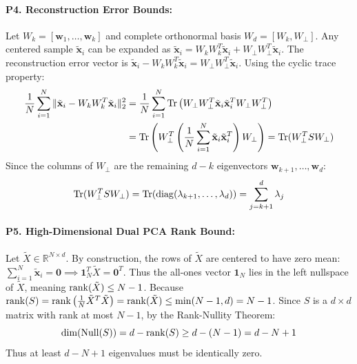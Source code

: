 \paragraph{P4. Reconstruction Error Bounds:}
Let $W_k = [\mathbf{w}_1, \dots, \mathbf{w}_k]$ and complete orthonormal basis $W_d = [W_k, W_\perp]$.
Any centered sample $\tilde{\mathbf{x}}_i$ can be expanded as $\tilde{\mathbf{x}}_i = W_k W_k^T \tilde{\mathbf{x}}_i + W_\perp W_\perp^T \tilde{\mathbf{x}}_i$.
The reconstruction error vector is $\tilde{\mathbf{x}}_i - W_k W_k^T \tilde{\mathbf{x}}_i = W_\perp W_\perp^T \tilde{\mathbf{x}}_i$.
Using the cyclic trace property:
\begin{align*}
\frac{1}{N} \sum_{i=1}^N \|\tilde{\mathbf{x}}_i - W_k W_k^T \tilde{\mathbf{x}}_i\|_2^2 &= \frac{1}{N} \sum_{i=1}^N \operatorname{Tr}\left( W_\perp W_\perp^T \tilde{\mathbf{x}}_i \tilde{\mathbf{x}}_i^T W_\perp W_\perp^T \right) \\
&= \operatorname{Tr}\left( W_\perp^T \left( \frac{1}{N} \sum_{i=1}^N \tilde{\mathbf{x}}_i \tilde{\mathbf{x}}_i^T \right) W_\perp \right) = \operatorname{Tr}(W_\perp^T S W_\perp)
\end{align*}
Since the columns of $W_\perp$ are the remaining $d - k$ eigenvectors $\mathbf{w}_{k+1}, \dots, \mathbf{w}_d$:
\begin{equation*}
\operatorname{Tr}(W_\perp^T S W_\perp) = \operatorname{Tr}(\operatorname{diag}(\lambda_{k+1}, \dots, \lambda_d)) = \sum_{j=k+1}^d \lambda_j
\end{equation*}

\paragraph{P5. High-Dimensional Dual PCA Rank Bound:}
Let $\tilde{X} \in \mathbb{R}^{N \times d}$. By construction, the rows of $\tilde{X}$ are centered to have zero mean: $\sum_{i=1}^N \tilde{\mathbf{x}}_i = \mathbf{0} \implies \mathbf{1}_N^T \tilde{X} = \mathbf{0}^T$.
Thus the all-ones vector $\mathbf{1}_N$ lies in the left nullspace of $\tilde{X}$, meaning $\operatorname{rank}(\tilde{X}) \le N - 1$.
Because $\operatorname{rank}(S) = \operatorname{rank}\left(\frac{1}{N}\tilde{X}^T \tilde{X}\right) = \operatorname{rank}(\tilde{X}) \le \min(N - 1, d) = N - 1$.
Since $S$ is a $d \times d$ matrix with rank at most $N - 1$, by the Rank-Nullity Theorem:
\begin{equation*}
\dim(\operatorname{Null}(S)) = d - \operatorname{rank}(S) \ge d - (N - 1) = d - N + 1
\end{equation*}
Thus at least $d - N + 1$ eigenvalues must be identically zero.

